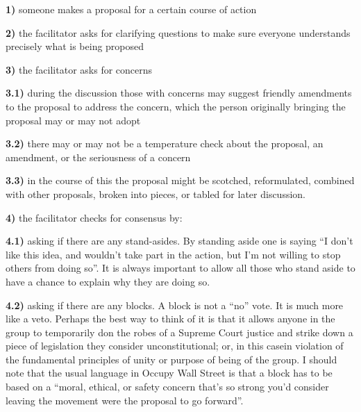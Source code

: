 \documentclass{article}
\begin{document}
{\setlength{\parindent}{0pt}
	
\textbf{1)} someone makes a proposal for a certain course of action

\vspace{0.2cm}

\textbf{2)} the facilitator asks for clarifying questions to make sure everyone understands precisely what is being proposed

\vspace{0.2cm}

\textbf{3)} the facilitator asks for concerns

{\leftskip=1cm
\indent \textbf{3.1)} during the discussion those with concerns may suggest friendly amendments to the proposal to address the concern, which the person originally bringing the proposal may or may not adopt

\indent \textbf{3.2)} there may or may not be a temperature check about the proposal, an amendment, or the seriousness of a concern

\indent \textbf{3.3)} in the course of this the proposal might be scotched, reformulated, combined with other proposals, broken into pieces, or tabled for later discussion.

\par}

\vspace{0.2cm}

\textbf{4)} the facilitator checks for consensus by:

{\leftskip=1cm
 \textbf{4.1)} asking if there are any stand-asides. By standing aside one is saying “I don’t like this idea, and wouldn’t take part in the action, but I’m not willing to stop others from doing so”. It is always important to allow all those who stand aside to have a chance to explain why they are doing so.

 \textbf{4.2)} asking if there are any blocks. A block is not a “no” vote. It is much more like a veto. Perhaps the best way to think of it is that it allows anyone in the group to temporarily don the robes of a Supreme Court justice and strike down a piece of legislation they consider unconstitutional; or, in this casein violation of the fundamental principles of unity or purpose of being of the group.  I should note that the usual language in Occupy Wall Street is that a block has to be based on a “moral, ethical, or safety concern that’s so strong you’d consider leaving the movement were the proposal to go forward”.
 
\par}
\par}
\end{document}
